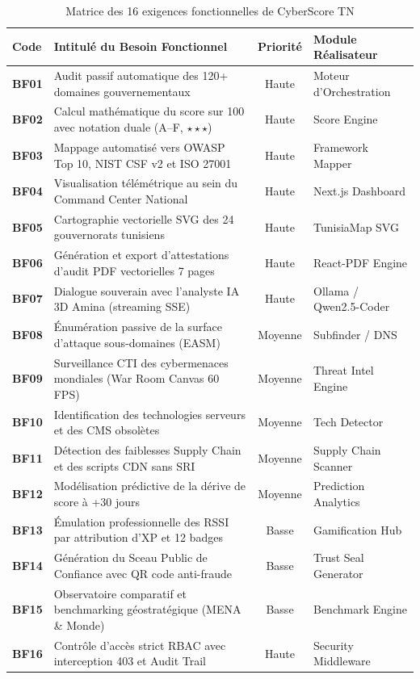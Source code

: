 \begin{table}[!htbp]
\centering
\caption{Matrice des 16 exigences fonctionnelles de CyberScore TN}
\label{tab:besoins_fonctionnels}
\footnotesize
\renewcommand{\arraystretch}{1.08}
\begin{tabularx}{\textwidth}{l X c p{3.8cm}}
\toprule
\textbf{Code} & \textbf{Intitulé du Besoin Fonctionnel} & \textbf{Priorité} & \textbf{Module Réalisateur} \\
\midrule
\textbf{BF01} & Audit passif automatique des 120+ domaines gouvernementaux & Haute & Moteur d'Orchestration \\
\textbf{BF02} & Calcul mathématique du score sur 100 avec notation duale (A--F, $\star\star\star$) & Haute & Score Engine \\
\textbf{BF03} & Mappage automatisé vers OWASP Top 10, NIST CSF v2 et ISO 27001 & Haute & Framework Mapper \\
\textbf{BF04} & Visualisation télémétrique au sein du Command Center National & Haute & Next.js Dashboard \\
\textbf{BF05} & Cartographie vectorielle SVG des 24 gouvernorats tunisiens & Haute & TunisiaMap SVG \\
\textbf{BF06} & Génération et export d'attestations d'audit PDF vectorielles 7 pages & Haute & React-PDF Engine \\
\textbf{BF07} & Dialogue souverain avec l'analyste IA 3D Amina (streaming SSE) & Haute & Ollama / Qwen2.5-Coder \\
\textbf{BF08} & Énumération passive de la surface d'attaque sous-domaines (EASM) & Moyenne & Subfinder / DNS \\
\textbf{BF09} & Surveillance CTI des cybermenaces mondiales (War Room Canvas 60 FPS) & Moyenne & Threat Intel Engine \\
\textbf{BF10} & Identification des technologies serveurs et des CMS obsolètes & Moyenne & Tech Detector \\
\textbf{BF11} & Détection des faiblesses Supply Chain et des scripts CDN sans SRI & Moyenne & Supply Chain Scanner \\
\textbf{BF12} & Modélisation prédictive de la dérive de score à +30 jours & Moyenne & Prediction Analytics \\
\textbf{BF13} & Émulation professionnelle des RSSI par attribution d'XP et 12 badges & Basse & Gamification Hub \\
\textbf{BF14} & Génération du Sceau Public de Confiance avec QR code anti-fraude & Basse & Trust Seal Generator \\
\textbf{BF15} & Observatoire comparatif et benchmarking géostratégique (MENA \& Monde) & Basse & Benchmark Engine \\
\textbf{BF16} & Contrôle d'accès strict RBAC avec interception 403 et Audit Trail & Haute & Security Middleware \\
\bottomrule
\end{tabularx}
\end{table}

